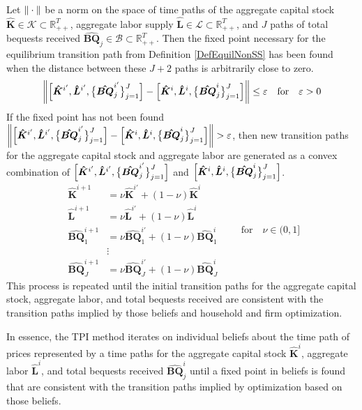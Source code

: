   Let $\left\lVert\:\cdot\:\right\rVert$ be a norm on the space of time paths of the aggregate capital stock $\bm{\hat{K}}\in\mathcal{K}\subset\mathbb{R}_{++}^T$, aggregate labor supply $\bm{\hat{L}}\in\mathcal{L}\subset\mathbb{R}_{++}^T$, and $J$ paths of total bequests received $\bm{\hat{BQ}}_j\in\mathcal{B}\subset\mathbb{R}_{++}^T$. Then the fixed point necessary for the equilibrium transition path from Definition \ref{DefEquilNonSS} has been found when the distance between these $J+2$ paths is arbitrarily close to zero.
  \begin{equation}\label{EqTPIconverge}
    \left\lVert\Bigl[\bm{\hat{K}}^{i'}, \bm{\hat{L}}^{i'},\bigl\{\bm{\hat{BQ}}_j^{i'}\bigr\}_{j=1}^J\Bigr] - \Bigl[\bm{\hat{K}}^{i},\bm{\hat{L}}^{i},\bigl\{\bm{\hat{BQ}}_j^{i}\bigr\}_{j=1}^J\Bigr]\right\rVert \leq \varepsilon \quad\text{for}\quad \varepsilon>0
  \end{equation}
  If the fixed point has not been found $\left\lVert\Bigl[\bm{\hat{K}}^{i'}, \bm{\hat{L}}^{i'},\bigl\{\bm{\hat{BQ}}_j^{i'}\bigr\}_{j=1}^J\Bigr] - \Bigl[\bm{\hat{K}}^{i},\bm{\hat{L}}^{i},\bigl\{\bm{\hat{BQ}}_j^{i}\bigr\}_{j=1}^J\Bigr]\right\rVert > \varepsilon$, then new transition paths for the aggregate capital stock and aggregate labor are generated as a convex combination of $\Bigl[\bm{\hat{K}}^{i'},\bm{\hat{L}}^{i'},\bigl\{\bm{\hat{BQ}}_j^{i'}\bigr\}_{j=1}^J\Bigr]$ and $\Bigl[\bm{\hat{K}}^{i},\bm{\hat{L}}^{i},\bigl\{\bm{\hat{BQ}}_j^{i}\bigr\}_{j=1}^J\Bigr]$.
  \begin{equation}\label{EqTPInewpath}
    \begin{split}
      \bm{\hat{K}}^{i+1} &= \nu\bm{\hat{K}}^{i'} + (1-\nu)\bm{\hat{K}}^{i} \\
      \bm{\hat{L}}^{i+1} &= \nu\bm{\hat{L}}^{i'} + (1-\nu)\bm{\hat{L}}^{i} \\
      \bm{\hat{BQ}}_1^{i+1} &= \nu\bm{\hat{BQ}}_1^{i'} + (1-\nu)\bm{\hat{BQ}}_1^{i} \\
      &\vdots \\
      \bm{\hat{BQ}}_J^{i+1} &= \nu\bm{\hat{BQ}}_J^{i'} + (1-\nu)\bm{\hat{BQ}}_J^{i}
    \end{split} \quad\quad\text{for}\quad \nu\in(0,1]
  \end{equation}
  This process is repeated until the initial transition paths for the aggregate capital stock, aggregate labor, and total bequests received are consistent with the transition paths implied by those beliefs and household and firm optimization.

  In essence, the TPI method iterates on individual beliefs about the time path of prices represented by a time paths for the aggregate capital stock $\bm{\hat{K}}^i$, aggregate labor $\bm{\hat{L}}^i$, and total bequests received $\bm{\hat{BQ}}_j^i$ until a fixed point in beliefs is found that are consistent with the transition paths implied by optimization based on those beliefs.

